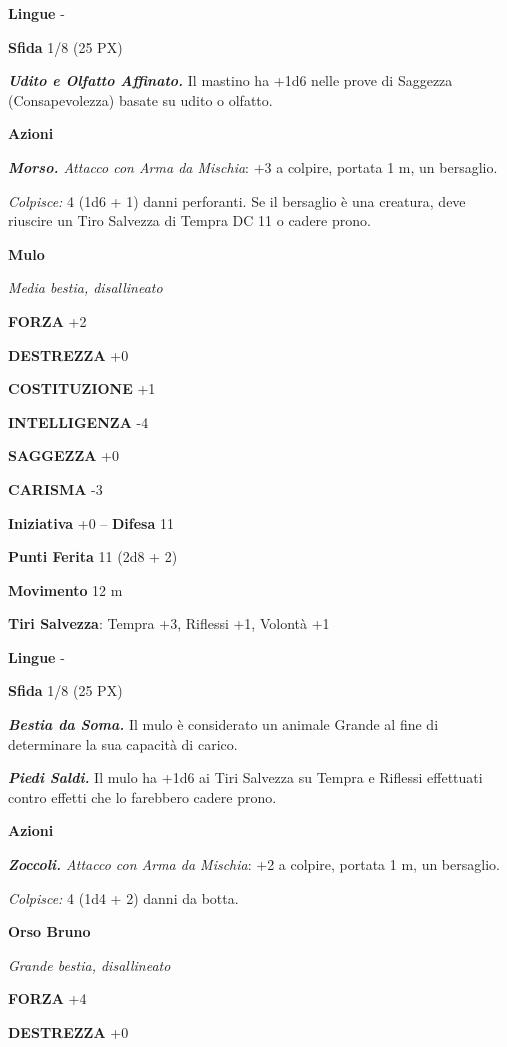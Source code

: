 \begin{multicols}{2}
\textbf{Lingue} -

\textbf{Sfida} 1/8 (25 PX)

\textit{\textbf{Udito e Olfatto Affinato.}} Il mastino ha +1d6 nelle prove di Saggezza (Consapevolezza) basate su udito o olfatto.

\textbf{Azioni}

\textit{\textbf{Morso.} Attacco con Arma da Mischia}: +3 a colpire, portata 1 m, un bersaglio.

\textit{Colpisce:} 4 (1d6 + 1) danni perforanti. Se il bersaglio è una creatura, deve riuscire un Tiro Salvezza di Tempra DC 11 o cadere prono.

\medskip\textbf{Mulo}

\textit{Media bestia, disallineato}

\textbf{FORZA} +2

\textbf{DESTREZZA} +0

\textbf{COSTITUZIONE} +1

\textbf{INTELLIGENZA} -4

\textbf{SAGGEZZA} +0

\textbf{CARISMA} -3

\textbf{Iniziativa} +0 -- \textbf{Difesa} 11

\textbf{Punti Ferita} 11 (2d8 + 2)

\textbf{Movimento} 12 m

\textbf{Tiri Salvezza}: Tempra +3, Riflessi +1, Volontà +1

\textbf{Lingue} -

\textbf{Sfida} 1/8 (25 PX)

\textit{\textbf{Bestia da Soma.}} Il mulo è considerato un animale Grande al fine di determinare la sua capacità di carico.

\textit{\textbf{Piedi Saldi.}} Il mulo ha +1d6 ai Tiri Salvezza su Tempra e Riflessi effettuati contro effetti che lo farebbero cadere prono.

\textbf{Azioni}

\textit{\textbf{Zoccoli.} Attacco con Arma da Mischia}: +2 a colpire, portata 1 m, un bersaglio.

\textit{Colpisce:} 4 (1d4 + 2) danni da botta.

\medskip\textbf{Orso Bruno}

\textit{Grande bestia, disallineato}

\textbf{FORZA} +4

\textbf{DESTREZZA} +0


\end{multicols}
